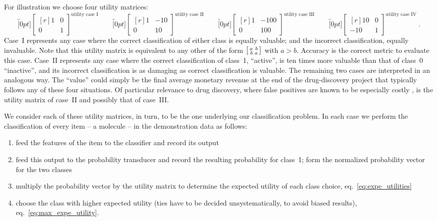 \documentclass[\ifafour a4paper,12pt,\else a5paper,10pt,\fi%
onecolumn,oneside,article,%
british%
]{memoir}
\theoremstyle{remark}
\theoremstyle{innote}
\renewcommand*{\|}[1][]{\nonscript\:#1\vert\nonscript\:\mathopen{}}
\newcommand*{\sect}{\S}%
\newcommand*{\eqn}{eq.}%
\newcommand*{\umatrix}[4]{\begin{bmatrix*}[r]#1&#2\\#3&#4\end{bmatrix*}}
\newcommand*{\sumatrix}[4]{\begin{bsmallmatrix*}[r]#1&#2\\#3&#4\end{bsmallmatrix*}}
\begin{document}
For illustration we choose four utility matrices:
\begin{equation}
  \label{eq:utility_matrices_demo}
  \overbracket[0pt]{\umatrix{1}{0}{0}{1}}^{\text{utility case I}} \qquad
  \overbracket[0pt]{\umatrix{1}{-10}{0}{10}}^{\text{utility case II}} \qquad
  \overbracket[0pt]{\umatrix{1}{-100}{0}{100}}^{\text{utility case III}} \qquad
  \overbracket[0pt]{\umatrix{10}{0}{-10}{1}}^{\text{utility case IV}} \ .
\end{equation}
Case~I represents any case where the correct classification of either class is equally valuable; and the incorrect classification, equally invaluable. Note that this utility matrix is equivalent to any other of the form $\sumatrix{a}{b}{b}{a}$ with $a>b$. Accuracy is the correct metric to evaluate this case. Case~II represents any case where the correct classification of class~1, \enquote{active}, is ten times more valuable than that of class~0 \enquote{inactive}, and its incorrect classification is as damaging as correct classification is valuable. The remaining two cases are interpreted in an analogous way. The \enquote{value} could simply be the final average monetary revenue at the end of the drug-discovery project that typically follows any of these four situations. Of particular relevance to drug discovery, where false positives are known to be especially costly \autocites{sinketal2010,hingoranietal2019}, is the utility matrix of case~II and possibly that of case~III.

We consider each of these utility matrices, in turn, to be the one underlying our classification problem. In each case we perform the classification of every item -- a molecule -- in the demonstration data as follows:
\begin{enumerate}[label=\arabic*.]
\item feed the features of the item to the classifier and record its output
\item feed this output to the probability transducer and record the resulting probability for class~1; form the normalized probability vector for the two classes 
\item multiply the probability vector by the utility matrix to determine the expected utility of each class choice, \eqn~\eqref{eq:expe_utilities}
\item choose the class with higher expected utility (ties have to be decided unsystematically, to avoid biased results), \eqn~\eqref{eq:max_expe_utility}.
\end{enumerate}
\end{document}
